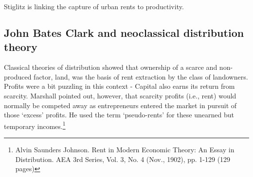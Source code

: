 



Stiglitz is linking the capture of urban rents to productivity.

  \subsection{John Bates Clark and neoclassical distribution theory}
  Classical theories of distribution showed that ownership of a scarce and non-produced factor, land, was the  basis of rent extraction by the class of landowners. Profits were a bit puzzling in this context - Capital also earns its return from scarcity. Marshall pointed out, however, that scarcity profits (i.e., rent) would normally be competed away  as entrepreneurs entered the market in pursuit of those `excess' profits. He used the term `pseudo-rents' for these unearned but temporary incomes.\footnote{Alvin Saunders Johnson. Rent in Modern Economic Theory: An Essay in Distribution. AEA 3rd Series, Vol. 3, No. 4 (Nov., 1902), pp. 1-129 (129 pages)}

